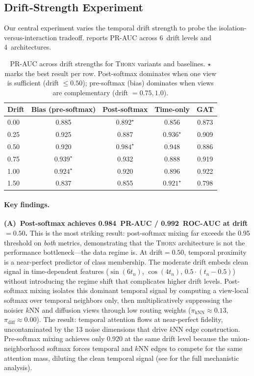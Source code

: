 \documentclass[11pt,a4paper]{article}
\newcommand{\thorn}{\textsc{Thorn}}
\begin{document}
\subsection{Drift-Strength Experiment}
\label{sec:drift}

Our central experiment varies the temporal drift strength to probe the
isolation-versus-interaction tradeoff.
 reports PR-AUC across 6~drift levels and
4~architectures.

\begin{table}[t]
\centering
\caption{PR-AUC across drift strengths for \thorn{} variants and
baselines.
$\star$ marks the best result per row.
Post-softmax dominates when one view is sufficient (drift $\le 0.50$);
pre-softmax (bias) dominates when views are complementary
(drift $= 0.75, 1.0$).}
\label{tab:drift}
\begin{tabular}{@{}lcccc@{}}
\toprule
Drift & Bias (pre-softmax) & Post-softmax & Time-only & GAT \\
\midrule
0.00 & 0.885 & $\mathbf{0.892}^\star$ & 0.856 & 0.873 \\
0.25 & 0.925 & 0.887 & $\mathbf{0.936}^\star$ & 0.909 \\
0.50 & 0.920 & $\mathbf{0.984}^\star$ & 0.948 & 0.886 \\
0.75 & $\mathbf{0.939}^\star$ & 0.932 & 0.888 & 0.919 \\
1.00 & $\mathbf{0.924}^\star$ & 0.920 & 0.896 & 0.922 \\
1.50 & 0.837 & 0.855 & $\mathbf{0.921}^\star$ & 0.798 \\
\bottomrule
\end{tabular}
\end{table}

\paragraph{Key findings.}
\textbf{(A)~Post-softmax achieves 0.984~PR-AUC / 0.992~ROC-AUC at
drift${}=0.50$.}
This is the most striking result: post-softmax mixing far exceeds the
0.95 threshold on \emph{both} metrics, demonstrating that the \thorn{}
architecture is not the performance bottleneck---the data regime is.
At drift${} = 0.50$, temporal proximity is a near-perfect predictor of
class membership.
The moderate drift embeds clean signal in time-dependent features
($\sin(6t_n)$, $\cos(4t_n)$, $0.5 \cdot (t_n - 0.5)$) without
introducing the regime shift that complicates higher drift levels.
Post-softmax mixing isolates this dominant temporal signal by computing
a view-local softmax over temporal neighbors only, then multiplicatively
suppressing the noisier $k$NN and diffusion views through low routing
weights ($\pi_{\text{kNN}} \approx 0.13$, $\pi_{\text{diff}} \approx
0.00$).
The result: temporal attention flows at near-perfect fidelity, uncontaminated
by the 13 noise dimensions that drive $k$NN edge construction.
Pre-softmax mixing achieves only 0.920 at the same drift level because
the union-neighborhood softmax forces temporal and $k$NN edges to compete
for the same attention mass, diluting the clean temporal signal
(see  for the full mechanistic analysis).
\end{document}
